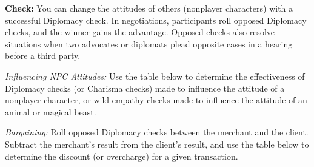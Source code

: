 \textbf{Check:} You can change the attitudes of others (nonplayer characters) with a successful Diplomacy check. In negotiations, participants roll opposed Diplomacy checks, and the winner gains the advantage. Opposed checks also resolve situations when two advocates or diplomats plead opposite cases in a hearing before a third party.

\textit{Influencing NPC Attitudes:} Use the table below to determine the effectiveness of Diplomacy checks (or Charisma checks) made to influence the attitude of a nonplayer character, or wild empathy checks made to influence the attitude of an animal or magical beast.



\textit{Bargaining:} Roll opposed Diplomacy checks between the merchant and the client. Subtract the merchant's result from the client's result, and use the table below to determine the discount (or overcharge) for a given transaction. 


